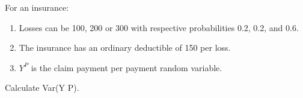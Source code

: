 For an insurance:
\begin{enumerate}
\item Losses can be 100, 200 or 300 with respective probabilities 0.2, 0.2, and 0.6.
\item The insurance has an ordinary deductible of 150 per loss.
\item $Y^P$ is the claim payment per payment random variable.
\end{enumerate}
Calculate Var(Y P).

